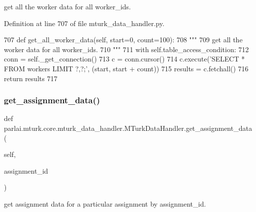 \begin{DoxyVerb}get all the worker data for all worker_ids.
\end{DoxyVerb}
 

Definition at line 707 of file mturk\+\_\+data\+\_\+handler.\+py.


\begin{DoxyCode}
707     \textcolor{keyword}{def }get\_all\_worker\_data(self, start=0, count=100):
708         \textcolor{stringliteral}{"""}
709 \textcolor{stringliteral}{        get all the worker data for all worker\_ids.}
710 \textcolor{stringliteral}{        """}
711         with self.table\_access\_condition:
712             conn = self.\_get\_connection()
713             c = conn.cursor()
714             c.execute(\textcolor{stringliteral}{'SELECT * FROM workers LIMIT ?,?;'}, (start, start + count))
715             results = c.fetchall()
716             \textcolor{keywordflow}{return} results
717 
\end{DoxyCode}
\mbox{\label{classparlai_1_1mturk_1_1core_1_1mturk__data__handler_1_1MTurkDataHandler_ab41299fc55cf09e4d0921aac63889a86}} 
\subsubsection{\texorpdfstring{get\+\_\+assignment\+\_\+data()}{get\_assignment\_data()}}
{\footnotesize\ttfamily def parlai.\+mturk.\+core.\+mturk\+\_\+data\+\_\+handler.\+M\+Turk\+Data\+Handler.\+get\+\_\+assignment\+\_\+data (\begin{DoxyParamCaption}\item[{}]{self,  }\item[{}]{assignment\+\_\+id }\end{DoxyParamCaption})}

\begin{DoxyVerb}get assignment data for a particular assignment by assignment_id.
\end{DoxyVerb}
 

